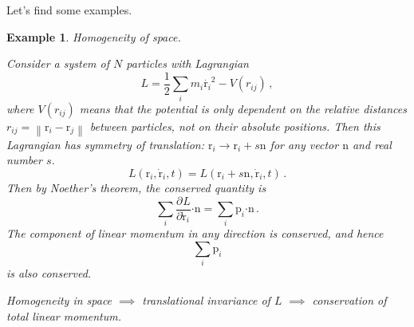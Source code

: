 \documentclass{article}
\theoremstyle{plain}\theoremheaderfont{\normalfont\itshape}\theorembodyfont{\rmfamily}\theoremseparator{.}\newtheorem*{rem}{Remark}\newtheorem*{ex}{Example}\newtheorem*{proof}{Proof}\newtheorem*{altp}{Alternative proof}
\theoremstyle{plain}\theoremheaderfont{\normalfont\bfseries}\theorembodyfont{\rmfamily}\theoremseparator{.}\newtheorem{thm}{Theorem}[section]\newtheorem{lem}[thm]{Lemma}\newtheorem{prop}[thm]{Proposition}\newtheorem*{cor}{Corollary}\newtheorem{defn}[thm]{Definition}\newtheorem{clm}[thm]{Claim}\newtheorem{clminproof}{Claim}\newtheorem{alg}[thm]{Algorithm}\newtheorem{hyp}[thm]{Hypothesis}\newtheorem{law}[thm]{Law}
\theoremstyle{break}\theoremheaderfont{\normalfont\itshape}\theorembodyfont{\rmfamily}\theoremseparator{.\medskip}\newtheorem*{proofskip}{Proof}\newtheorem*{exs}{Examples}\newtheorem*{rems}{Remarks}
\theoremstyle{break}\theoremheaderfont{\normalfont\bfseries}\theorembodyfont{\rmfamily}\theoremseparator{.\medskip}\newtheorem{lemskip}[thm]{Lemma}\newtheorem{defnskip}[thm]{Definition}\newtheorem{propskip}[thm]{Proposition}\newtheorem{thmskip}[thm]{Theorem}
\numberwithin{equation}{section}
\newcommand{\pdv}[3][]{\frac{\partial^{#1} #2}{{\partial #3}^{#1}}}
\newcommand{\vb}[1]{\bm{\mathrm{#1}}}
\newcommand{\vdot}{\bm{\cdot}}
\newcommand{\norm}[1]{\left\| #1 \right\|}
\begin{document}
    Let's find some examples.
    \begin{ex}
        \textit{Homogeneity of space}.

        Consider a system of \(N\) particles with Lagrangian
        \begin{equation}
            L=\frac{1}{2}\sum_i m_i\dot{\vb{r}_i}^2-V(r_{ij})\,,
        \end{equation}
        where \(V(r_{ij})\) means that the potential is only dependent on the relative distances \(r_{ij}=\norm{\vb{r}_i-\vb{r}_j}\) between particles, not on their absolute positions. Then this Lagrangian has symmetry of translation: \(\vb{r}_i\to\vb{r}_i+s\vb{n}\) for any vector \(\vb{n}\) and real number \(s\).
        \begin{equation}
            L(\vb{r}_i,\dot{\vb{r}}_i,t)=L(\vb{r}_i+s\vb{n},\dot{\vb{r}}_i,t)\,.
        \end{equation}
        Then by Noether's theorem, the conserved quantity is
        \begin{equation}
            \sum_i\pdv{L}{\dot{\vb{r}}_i}\vdot\vb{n}=\sum_i\vb{p}_i\vdot\vb{n}\,.
        \end{equation}
        The component of linear momentum in any direction is conserved, and hence
        \begin{equation}
            \sum_i\vb{p}_i
        \end{equation}
        is also conserved.

        Homogeneity in space \(\implies\) translational invariance of \(L\) \(\implies\) conservation of total linear momentum.
    \end{ex}
\end{document}
